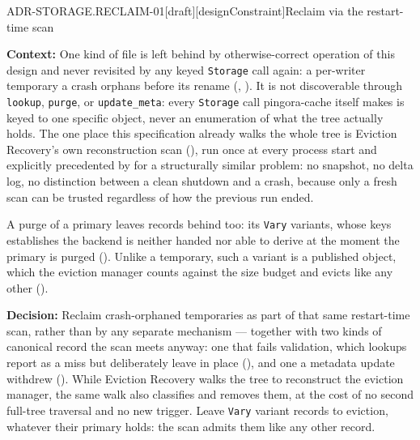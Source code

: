 \begin{requirement}{ADR-STORAGE.RECLAIM-01}[draft][designConstraint]{Reclaim via the restart-time scan}


  \textbf{Context:} One kind of file is left behind by otherwise-correct
  operation of this design and never revisited by any keyed
  \texttt{Storage} call again: a per-writer temporary a crash orphans before
  its rename (, ).
  It is not discoverable through
  \texttt{lookup}, \texttt{purge}, or \texttt{update\_meta}: every
  \texttt{Storage} call pingora-cache itself makes is keyed to one specific
  object, never an enumeration of what the tree actually holds. The one
  place this specification already walks the whole tree is Eviction
  Recovery's own reconstruction scan (),
  run once at every process start and explicitly precedented by
   for a structurally similar problem: no
  snapshot, no delta log, no distinction between a clean shutdown and a
  crash, because only a fresh scan can be trusted regardless of how the
  previous run ended.

  A purge of a primary leaves records behind too: its \texttt{Vary}
  variants, whose keys  establishes the backend
  is neither handed nor able to derive at the moment the primary is purged
  (). Unlike a temporary, such a variant is
  a published object, which the eviction manager counts against the size
  budget and evicts like any other ().

  \textbf{Decision:} Reclaim crash-orphaned temporaries as part of that same
  restart-time scan, rather than by any separate mechanism --- together with
  two kinds of canonical record the scan meets anyway: one that fails
  validation, which lookups report as a miss but deliberately leave in place
  (), and one a metadata update withdrew
  (). While Eviction Recovery walks the tree
  to reconstruct the eviction manager, the same walk also classifies and
  removes them, at the cost of no second full-tree traversal and no new
  trigger. Leave \texttt{Vary} variant records to eviction, whatever their
  primary holds: the scan admits them like any other record.


\end{requirement}
